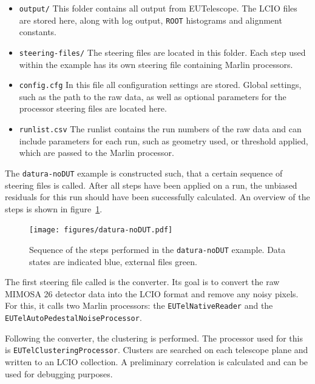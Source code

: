 \begin{itemize}

\item \texttt{output/} This folder contains all output from EUTelescope. The
LCIO files are stored here, along with log output, \texttt{ROOT} histograms and
alignment constants.

\item \texttt{steering-files/} The steering files are located in this folder.
Each step used within the example has its own steering file containing Marlin
processors.

\item\texttt{config.cfg} In this file all configuration settings are stored.
Global settings, such as the path to the raw data, as well as optional
parameters for the processor steering files are located here.

\item \texttt{runlist.csv} The runlist contains the run numbers of the raw
data and can include parameters for each run, such as geometry used, or
threshold applied, which are passed to the Marlin processor.

\end{itemize}

The \texttt{datura-noDUT} example is constructed such, that a certain sequence
of steering files is called. After all steps have been applied on a run, the
unbiased residuals for this run should have been successfully calculated. An
overview of the steps is shown in figure~\ref{fig:datura-nodutsequence}.

\begin{figure}[tbp]
  \centering
  \texttt{[image: figures/datura-noDUT.pdf]}
  \caption[Steps performed in the \texttt{datura-noDUT} example]{Sequence of the
steps performed in the \texttt{datura-noDUT} example. Data states are indicated
blue, external files green.}
  \label{fig:datura-nodutsequence}
\end{figure}

The first steering file called is the converter. Its goal is to convert the raw
MIMOSA 26 detector data into the LCIO format and remove any noisy pixels. For
this, it calls two Marlin processors: the \texttt{EUTelNativeReader} and the
\texttt{EUTelAutoPede\-stalNoiseProcessor}.

Following the converter, the clustering is performed. The processor used for
this is \texttt{EUTelClusteringProcessor}. Clusters are searched on each
telescope plane and written to an LCIO collection. A preliminary correlation is
calculated and can be used for debugging purposes.

